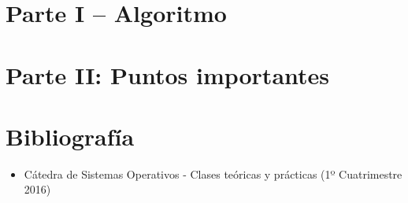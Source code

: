 \documentclass[a4paper,10pt,twoside]{article}
\begin{document}
\newpage




\tableofcontents

\newpage



\newpage
\section{Parte I – Algoritmo}


\newpage

\section{Parte II: Puntos importantes}


\newpage



\newpage
\section{Bibliografía}

\begin{itemize}
 \item Cátedra de Sistemas Operativos - Clases teóricas y prácticas (1º Cuatrimestre 2016)
\end{itemize}
\end{document}
